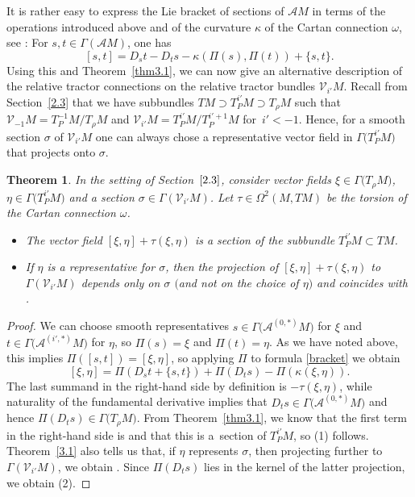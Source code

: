 \documentclass[10pt,a4paper]{amsart}
\numberwithin{equation}{section}
\newtheorem{Theorem}{Theorem}[section]
\def\Cal{\mathcal}
\newcommand{\ka}{\kappa}
\newcommand{\om}{\omega}
\newcommand{\si}{\sigma}
\newcommand{\Ga}{\Gamma}
\newcommand{\Om}{\Omega}
\begin{document}
It is rather easy to express the Lie bracket of sections of $\Cal AM$ in terms of the
operations introduced above and of the curvature $\ka$ of the Cartan connection $\om$,
see \cite[Corollary 1.5.8]{book}: For $s,t\in\Ga(\Cal AM)$, one has
\begin{equation}\label{bracket}
[s,t]=D_st-D_ts-\ka(\Pi(s),\Pi(t))+\{s,t\}.
\end{equation}
Using this and Theorem~\ref{thm3.1}, we can now give an alternative description of
the relative tractor connections on the relative tractor bundles $\Cal
V_{i'}M$. Recall from Section~\ref{2.3} that we have subbundles $TM\supset
T^{i'}_PM\supset T_\rho M$ such that $\Cal V_{-1}M=T^{-1}_P M/T_\rho M$ and $\Cal
V_{i'}M=T^{i'}_PM/T^{i'+1}_PM$ for~${i'<-1}$. Hence, for a smooth section $\si$ of $\Cal
V_{i'}M$ one can always chose a representative vector field in $\Ga\bigl(T^{i'}_PM\bigr)$ that
projects onto $\si$.

\begin{Theorem}\label{thm3.2.1}
In the setting of Section~$\ref{2.3}$, consider vector fields $\xi\in\Ga\bigl(T_\rho M\bigr)$,
$\eta\in\Ga\bigl(T^{i'}_PM\bigr)$ and a section $\si\in\Ga(\Cal V_{i'}M)$. Let
$\tau\in\Om^2(M,TM)$ be the torsion of the Cartan connection $\om$.
\begin{itemize}\itemsep=0pt
\item[$(1)$] The vector field $[\xi,\eta]+\tau(\xi,\eta)$ is a section of the subbundle
$T^{i'}_PM\subset TM$.

\item[$(2)$] If $\eta$ is a representative for $\si$, then the projection of
$[\xi,\eta]+\tau(\xi,\eta)$ to $\Ga(\Cal V_{i'}M)$ depends only on $\si$ $($and not on
the choice of $\eta)$ and coincides with \smash{$\nabla^{\rho,\Cal V_{i'}}_\xi\si$}.
\end{itemize}
\end{Theorem}
\begin{proof}
We can choose smooth representatives $s\in\Ga\bigl(\Cal A^{(0,*)}M\bigr)$ for $\xi$ and
$t\in\Ga\bigl(\Cal A^{(i',*)}M\bigr)$ for $\eta$, so $\Pi(s)=\xi$ and $\Pi(t)=\eta$. As we have
noted above, this implies $\Pi([s,t])=[\xi,\eta]$, so applying $\Pi$ to formula
\eqref{bracket} we obtain
\[
[\xi,\eta]=\Pi(D_st+\{s,t\})+\Pi(D_ts)-\Pi(\ka(\xi,\eta)).
\]
The last summand in the right-hand side by definition is $-\tau(\xi,\eta)$, while
naturality of the fundamental derivative implies that $D_t s\in\Ga\bigl(\Cal A^{(0,*)}M\bigr)$
and hence $\Pi(D_ts)\in\Ga\bigl(T_\rho M\bigr)$. From Theorem~\ref{thm3.1}, we know that the
first term in the right-hand side is \smash{$\Pi\bigl(\nabla^{\Cal AM}_\xi t\bigr)$} and that this is a~section
of $T^{i'}_PM$, so (1) follows. Theorem~\ref{3.1} also tells us that, if
$\eta$ represents $\si$, then projecting \smash{$\Pi\bigl(\nabla^{\Cal AM}_\xi t\bigr)$} further to
$\Ga(\Cal V_{i'}M)$, we obtain \smash{$\nabla^{\rho,\Cal V_{i'}}_\xi\si$}. Since $\Pi(D_ts)$
lies in the kernel of the latter projection, we obtain (2).
\end{proof}
\end{document}
